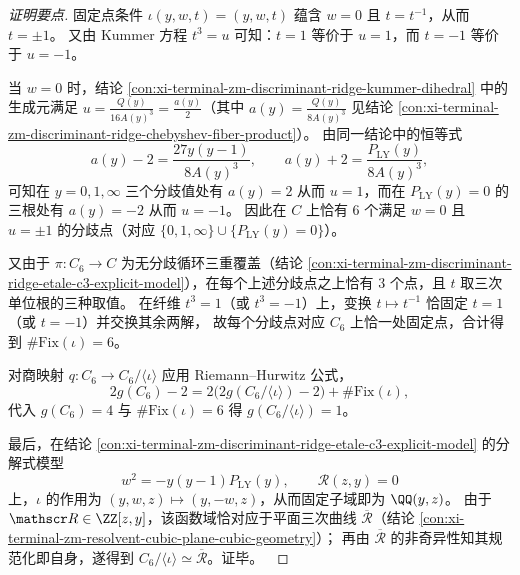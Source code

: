 \begin{proof}[证明要点]
固定点条件 \(\iota(y,w,t)=(y,w,t)\) 蕴含 \(w=0\) 且 \(t=t^{-1}\)，从而 \(t=\pm 1\)。
又由 Kummer 方程 \(t^{3}=u\) 可知：\(t=1\) 等价于 \(u=1\)，而 \(t=-1\) 等价于 \(u=-1\)。
\par
当 \(w=0\) 时，结论 \ref{con:xi-terminal-zm-discriminant-ridge-kummer-dihedral} 中的生成元满足 \(u=\frac{Q(y)}{16A(y)^{3}}=\frac{a(y)}{2}\)（其中 \(a(y)=\frac{Q(y)}{8A(y)^3}\) 见结论 \ref{con:xi-terminal-zm-discriminant-ridge-chebyshev-fiber-product}）。
由同一结论中的恒等式
\[
a(y)-2=\frac{27y(y-1)}{8A(y)^3},
\qquad
a(y)+2=\frac{P_{\mathrm{LY}}(y)}{8A(y)^3},
\]
可知在 \(y=0,1,\infty\) 三个分歧值处有 \(a(y)=2\) 从而 \(u=1\)，而在 \(P_{\mathrm{LY}}(y)=0\) 的三根处有 \(a(y)=-2\) 从而 \(u=-1\)。
因此在 \(C\) 上恰有 \(6\) 个满足 \(w=0\) 且 \(u=\pm 1\) 的分歧点（对应 \(\{0,1,\infty\}\cup\{P_{\mathrm{LY}}(y)=0\}\)）。
\par
又由于 \(\pi:C_6\to C\) 为无分歧循环三重覆盖（结论 \ref{con:xi-terminal-zm-discriminant-ridge-etale-c3-explicit-model}），在每个上述分歧点之上恰有 \(3\) 个点，且 \(t\) 取三次单位根的三种取值。
在纤维 \(t^{3}=1\)（或 \(t^{3}=-1\)）上，变换 \(t\mapsto t^{-1}\) 恰固定 \(t=1\)（或 \(t=-1\)）并交换其余两解，
故每个分歧点对应 \(C_6\) 上恰一处固定点，合计得到 \(\#\mathrm{Fix}(\iota)=6\)。
\par
对商映射 \(q:C_6\to C_6/\langle\iota\rangle\) 应用 Riemann--Hurwitz 公式，
\[
2g(C_6)-2=2\bigl(2g(C_6/\langle\iota\rangle)-2\bigr)+\#\mathrm{Fix}(\iota),
\]
代入 \(g(C_6)=4\) 与 \(\#\mathrm{Fix}(\iota)=6\) 得 \(g(C_6/\langle\iota\rangle)=1\)。
\par
最后，在结论 \ref{con:xi-terminal-zm-discriminant-ridge-etale-c3-explicit-model} 的分解式模型
\[
w^{2}=-y(y-1)P_{\mathrm{LY}}(y),\qquad \mathscr R(z,y)=0
\]
上，\(\iota\) 的作用为 \((y,w,z)\mapsto (y,-w,z)\)，从而固定子域即为 \(\QQ(y,z)\)。
由于 \(\mathscr R\in\ZZ[z,y]\)，该函数域恰对应于平面三次曲线 \(\overline{\mathcal R}\)（结论 \ref{con:xi-terminal-zm-resolvent-cubic-plane-cubic-geometry}）；
再由 \(\overline{\mathcal R}\) 的非奇异性知其规范化即自身，遂得到 \(C_6/\langle\iota\rangle\simeq \overline{\mathcal R}\)。证毕。\
\end{proof}

\endinput

